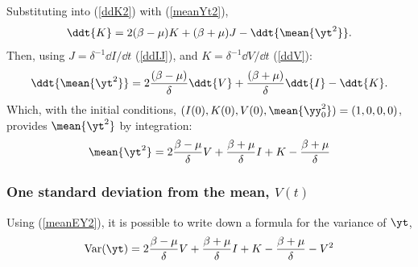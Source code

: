 Substituting into (\ref{ddK2}) with (\ref{meanYt2}), 
$$\ddt{K} =2(\beta-\mu)K+ (\beta + \mu)J- \ddt{\mean{\yt^2}}.$$
Then, using $J = \delta^{-1}\dd I/\dd t$ (\ref{ddIJ}), and $K = \delta^{-1} \dd V / \dd t$ (\ref{ddV}):
\begin{equation}
\ddt{\mean{\yt^2}} = 2\frac{(\beta-\mu)}{\delta}\ddt{V}+ \frac{(\beta + \mu)}{\delta}\ddt{I} - \ddt{K}.
\end{equation}
Which, with the initial conditions, $(I(0), K(0), V(0), \mean{\yy_0^2}) = (1,0,0,0)$, provides $\mean{\yt^2}$ by integration:
\begin{equation}
\label{meanEY2}
\mean{\yt^2} = 2\frac{\beta-\mu}{\delta} V + \frac{\beta+\mu}{\delta}I + K - \frac{\beta+\mu}{\delta}
\end{equation}


\subsubsection{One standard deviation from the mean, $V(t)$}

Using (\ref{meanEY2}), it is possible to write down a formula for the variance of $\yt$,
\begin{equation}
\label{VarY}
\text{Var}(\yt) = 2\frac{\beta-\mu}{\delta} V + \frac{\beta+\mu}{\delta}I + K - \frac{\beta+\mu}{\delta} - V^2
\end{equation}
